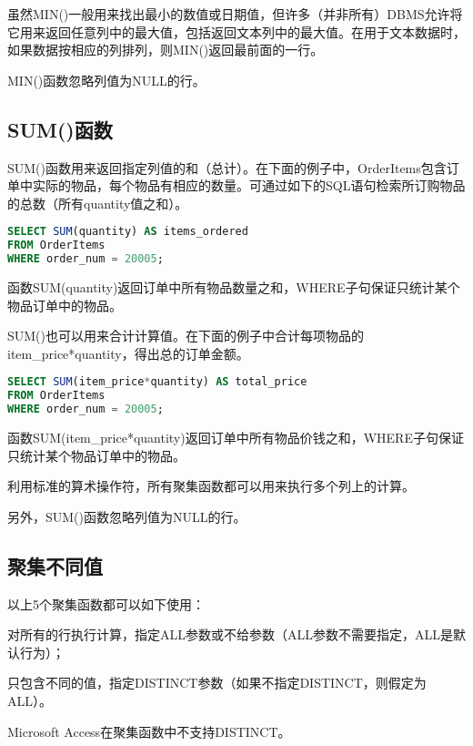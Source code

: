 虽然MIN()一般用来找出最小的数值或日期值，但许多（并非所有）DBMS允许将它用来返回任意列中的最大值，包括返回文本列中的最大值。在用于文本数据时，如果数据按相应的列排列，则MIN()返回最前面的一行。

MIN()函数忽略列值为NULL的行。
\subsection{SUM()函数}

SUM()函数用来返回指定列值的和（总计）。在下面的例子中，OrderItems包含订单中实际的物品，每个物品有相应的数量。可通过如下的SQL语句检索所订购物品的总数（所有quantity值之和）。

\begin{lstlisting}[language=SQL]
SELECT SUM(quantity) AS items_ordered
FROM OrderItems
WHERE order_num = 20005;
\end{lstlisting}

函数SUM(quantity)返回订单中所有物品数量之和，WHERE子句保证只统计某个物品订单中的物品。

SUM()也可以用来合计计算值。在下面的例子中合计每项物品的item\_price*quantity，得出总的订单金额。

\begin{lstlisting}[language=SQL]
SELECT SUM(item_price*quantity) AS total_price
FROM OrderItems
WHERE order_num = 20005;
\end{lstlisting}

函数SUM(item\_price*quantity)返回订单中所有物品价钱之和，WHERE子句保证只统计某个物品订单中的物品。

利用标准的算术操作符，所有聚集函数都可以用来执行多个列上的计算。

另外，SUM()函数忽略列值为NULL的行。

\subsection{聚集不同值}

以上5个聚集函数都可以如下使用：

\begin{compactitem}
\item 对所有的行执行计算，指定ALL参数或不给参数（ALL参数不需要指定，ALL是默认行为）；
\item 只包含不同的值，指定DISTINCT参数（如果不指定DISTINCT，则假定为ALL）。
\end{compactitem}

Microsoft Access在聚集函数中不支持DISTINCT。

